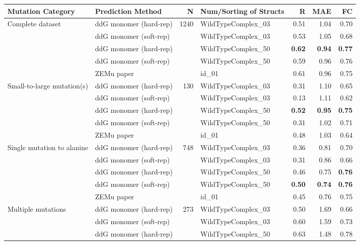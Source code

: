 \begin{table}
  \begin{tabular}{llrlrrr}
\toprule
Mutation Category &       Prediction Method &     N & Num/Sorting of Structs &    R &  MAE &   FC \\
\midrule
 \multirow{ 5}{*}{Complete dataset} & ddG monomer (hard-rep) & \multirow{ 5}{*}{1240} & WildTypeComplex\_03 & 0.51 & 1.04 & 0.70  \\
 & ddG monomer (soft-rep) & & WildTypeComplex\_03 & 0.53 & 1.05 & 0.68  \\
 & ddG monomer (hard-rep) & & WildTypeComplex\_50 & \textbf{0.62} & \textbf{0.94} & \textbf{0.77}  \\
 & ddG monomer (soft-rep) & & WildTypeComplex\_50 & 0.59 & 0.96 & 0.76  \\
 & ZEMu paper & & id\_01 & 0.61 & 0.96 & 0.75  \\
\hline
 \multirow{ 5}{*}{Small-to-large mutation(s)} & ddG monomer (hard-rep) & \multirow{ 5}{*}{130} & WildTypeComplex\_03 & 0.31 & 1.10 & 0.65  \\
 & ddG monomer (soft-rep) & & WildTypeComplex\_03 & 0.13 & 1.11 & 0.62  \\
 & ddG monomer (hard-rep) & & WildTypeComplex\_50 & \textbf{0.52} & \textbf{0.95} & \textbf{0.75}  \\
 & ddG monomer (soft-rep) & & WildTypeComplex\_50 & 0.31 & 1.02 & 0.71  \\
 & ZEMu paper & & id\_01 & 0.48 & 1.03 & 0.64  \\
\hline
 \multirow{ 5}{*}{Single mutation to alanine} & ddG monomer (hard-rep) & \multirow{ 5}{*}{748} & WildTypeComplex\_03 & 0.36 & 0.81 & 0.70  \\
 & ddG monomer (soft-rep) & & WildTypeComplex\_03 & 0.31 & 0.86 & 0.66  \\
 & ddG monomer (hard-rep) & & WildTypeComplex\_50 & 0.46 & 0.75 & \textbf{0.76}  \\
 & ddG monomer (soft-rep) & & WildTypeComplex\_50 & \textbf{0.50} & \textbf{0.74} & \textbf{0.76}  \\
 & ZEMu paper & & id\_01 & 0.45 & 0.76 & 0.75  \\
\hline
 \multirow{ 5}{*}{Multiple mutations} & ddG monomer (hard-rep) & \multirow{ 5}{*}{273} & WildTypeComplex\_03 & 0.50 & 1.69 & 0.66  \\
 & ddG monomer (soft-rep) & & WildTypeComplex\_03 & 0.60 & 1.59 & 0.73  \\
 & ddG monomer (hard-rep) & & WildTypeComplex\_50 & 0.63 & 1.48 & 0.78  \\

\end{tabular}
\end{table}
